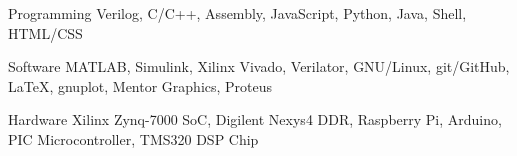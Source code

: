 
\begin{cvskills}

\cvskill
	{Programming} %
	{Verilog, C/C++, Assembly, JavaScript, Python, Java, Shell, HTML/CSS} %

\cvskill
	{Software} %
	{MATLAB, Simulink, Xilinx Vivado, Verilator, GNU/Linux, git/GitHub, \LaTeX, gnuplot, Mentor Graphics, Proteus} %

\cvskill
	{Hardware} %
	{Xilinx Zynq-7000 SoC, Digilent Nexys4 DDR, Raspberry Pi, Arduino, PIC Microcontroller, TMS320 DSP Chip} %

\end{cvskills}
